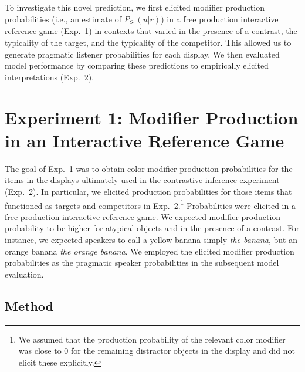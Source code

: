 \documentclass[10pt,letterpaper]{article}
\newcommand{\jd}[1]{\textcolor{Purple}{[jd: #1]}}
\begin{document}

To investigate this novel prediction, we first elicited modifier production probabilities (i.e., an estimate of $P_{S_1}(u|r)$) in a free production interactive reference game (Exp.~1) in contexts that varied in the presence of a contrast, the typicality of the target, and the typicality of the competitor. This allowed us to generate pragmatic listener probabilities for each display. We then evaluated model performance by comparing these predictions to empirically elicited interpretations (Exp.~2).


\section{Experiment 1: Modifier Production in an Interactive Reference Game}

The goal of Exp.~1 was to obtain color modifier production probabilities for the items in the displays ultimately used in the contrastive inference experiment (Exp.~2). In particular, we elicited production probabilities for those items that functioned as targets and competitors in Exp.~2.\footnote{We assumed that the production probability of the relevant color modifier was close to 0 for the remaining distractor objects in the display and did not elicit these explicitly.}  Probabilities were elicited in a free production interactive reference game. We expected modifier production probability to be higher for atypical objects and in the presence of a contrast. For instance, we expected speakers to call a yellow banana simply \textit{the banana}, but an orange banana \textit{the orange banana}. We employed the elicited modifier production probabilities as the pragmatic speaker probabilities in the subsequent model evaluation.

\subsection{Method}

\end{document}
